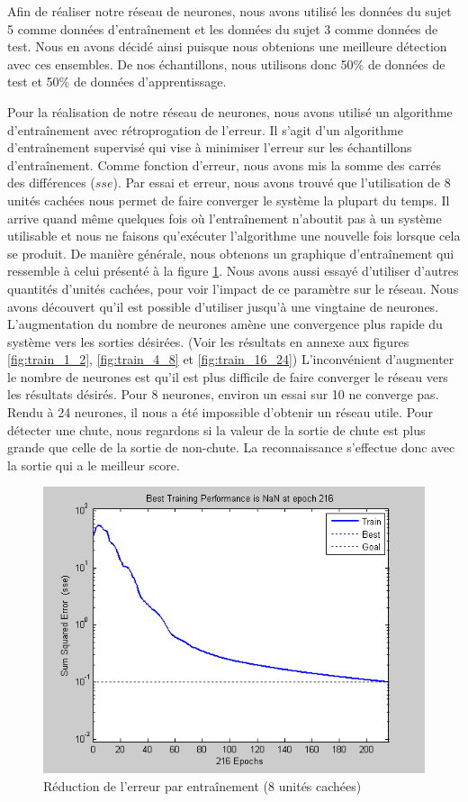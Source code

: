 \documentclass[12pt,letterpaper]{article}
\begin{document}
Afin de réaliser notre réseau de neurones, nous avons utilisé les données du sujet 5 comme données d'entraînement et les données du sujet 3 comme données de test. Nous en avons décidé ainsi puisque nous obtenions une meilleure détection avec ces ensembles. De nos échantillons, nous utilisons donc 50\%  de données de test et 50\% de données d'apprentissage.

Pour la réalisation de notre réseau de neurones, nous avons utilisé un algorithme d'entraînement avec rétroprogation de l'erreur. Il s'agit d'un algorithme d'entraînement supervisé qui vise à minimiser l'erreur sur les échantillons d'entraînement. Comme fonction d'erreur, nous avons mis la somme des carrés des différences ($sse$). Par essai et erreur, nous avons trouvé que l'utilisation de 8 unités cachées nous permet de faire converger le système la plupart du temps. Il arrive quand même quelques fois où l'entraînement n'aboutit pas à un système utilisable et nous ne faisons qu'exécuter l'algorithme une nouvelle fois lorsque cela se produit. De manière générale, nous obtenons un graphique d'entraînement qui ressemble à celui présenté à la figure \ref{fig:training_8units}. Nous avons aussi essayé d'utiliser d'autres quantités d'unités cachées, pour voir l'impact de ce paramètre sur le réseau. Nous avons découvert qu'il est possible d'utiliser jusqu'à une vingtaine de neurones. L'augmentation du nombre de neurones amène une convergence plus rapide du système vers les sorties désirées. (Voir les résultats en annexe aux figures \ref{fig:train_1_2}, \ref{fig:train_4_8} et \ref{fig:train_16_24}) L'inconvénient d'augmenter le nombre de neurones est qu'il est plus difficile de faire converger le réseau vers les résultats désirés. Pour 8 neurones, environ un essai sur 10 ne converge pas. Rendu à 24 neurones, il nous a été impossible d'obtenir un réseau utile. Pour détecter une chute, nous regardons si la valeur de la sortie de chute est plus grande que celle de la sortie de non-chute. La reconnaissance s'effectue donc avec la sortie qui a le meilleur score.

\begin{figure}
    \centering
    \includegraphics[scale=0.6]{image/training_8units.png}
    \caption{Réduction de l'erreur par entraînement (8 unités cachées)}
    \label{fig:training_8units}
\end{figure}
\end{document}
